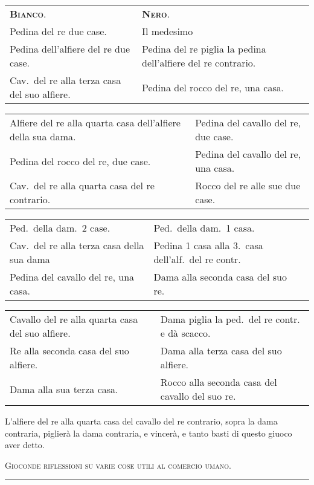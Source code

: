 \documentclass[11pt,a6paper]{article}
\newcommand{\supersection}[1]{%
\clearpage
    {\scshape \centering \huge #1\\}
    \vspace{6pt}
    \hrule
    \vspace{12pt}
}
\begin{document}
{\small
\noindent
\begin{tabular}{@{}p{3.84cm}p{3.84cm}}
 {\bfseries\scshape Bianco}. & {\bfseries\scshape Nero}.\\
 Pedina del re due case.& Il medesimo\\
Pedina dell'alfiere del re due case. & Pedina del re piglia la pedina dell'alfiere del re contrario.\\
Cav.\ del re alla terza casa del suo alfiere. &Pedina del rocco del re, una casa.\\
\end{tabular}

\noindent\begin{tabular}{@{}p{3.84cm}p{3.84cm}}
Alfiere del re alla quarta casa dell'alfiere della sua dama. & Pedina del cavallo del re, due case.\\
Pedina del rocco del re, due case. & Pedina del cavallo del re, una casa. \\
Cav.\ del re alla quarta casa del re contrario. & Rocco del re alle sue due case. \\
\end{tabular}

\noindent\begin{tabular}{@{}p{3.84cm}p{3.84cm}}
Ped.\ della dam.\ 2 case.& Ped.\ della dam.\ 1 casa. \\
Cav.\ del re alla terza casa della sua dama & Pedina 1 casa alla 3.\ casa dell'alf.\ del re contr.\\
Pedina del cavallo del re, una casa. & Dama alla seconda casa del suo re.\ \\
\end{tabular}

\noindent\begin{tabular}{@{}p{3.84cm}p{3.84cm}}
Cavallo del re alla quarta casa del suo alfiere. & Dama piglia la ped.\ del re contr. e dà scacco. \\
Re alla seconda casa del suo alfiere. & Dama alla terza casa del suo alfiere. \\
Dama alla sua terza casa. & Rocco alla seconda casa del cavallo del suo re. \\
\end{tabular}
}

L'alfiere del re alla quarta casa del cavallo del re
contrario, sopra la dama contraria, piglierà la
dama contraria, e vincerà, e tanto basti di questo giuoco aver detto.


\supersection{Gioconde riflessioni su varie cose utili
al comercio umano.}
\end{document}
